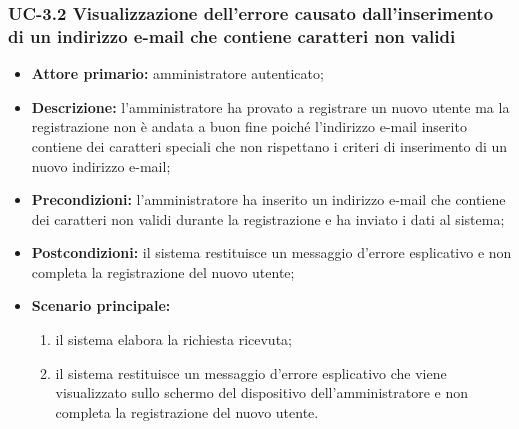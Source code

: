 \subsubsection{UC-3.2 Visualizzazione dell'errore causato dall'inserimento di un indirizzo e-mail che contiene caratteri non validi}
\begin{itemize}
	\item \textbf{Attore primario:} amministratore autenticato;

	\item \textbf{Descrizione:} l'amministratore ha provato a registrare un nuovo utente ma la registrazione non è andata a buon fine poiché l'indirizzo e-mail inserito contiene dei caratteri speciali che non rispettano i criteri di inserimento di un nuovo indirizzo e-mail;

	\item \textbf{Precondizioni:} l'amministratore ha inserito un indirizzo e-mail che contiene dei caratteri non validi durante la registrazione e ha inviato i dati al sistema;

	\item \textbf{Postcondizioni:} il sistema restituisce un messaggio d'errore esplicativo e non completa la registrazione del nuovo utente;

	\item \textbf{Scenario principale:}
	      \begin{enumerate}
		      \item il sistema elabora la richiesta ricevuta;
		      \item il sistema restituisce un messaggio d'errore esplicativo che viene visualizzato sullo schermo del dispositivo dell'amministratore e non completa la registrazione del nuovo utente.
	      \end{enumerate}
\end{itemize}

